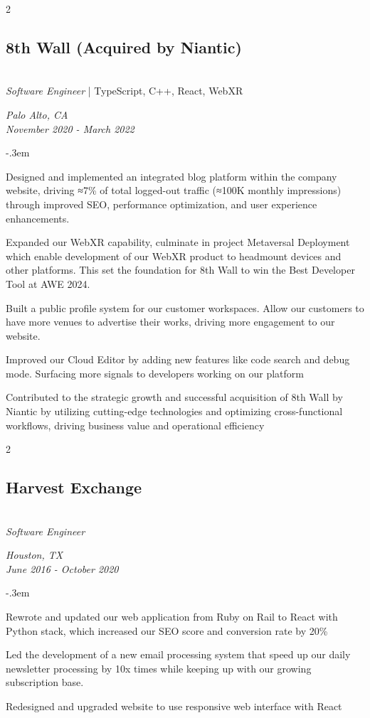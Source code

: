 \documentclass{article}
\let\olditemize=\itemize \let\endolditemize=\enditemize
\renewenvironment{itemize}{\olditemize[topsep=0em] \itemsep-.3em}{\endolditemize}
\newenvironment{twocolentry}[2][]{
    \def\secondColumn{#2}
    \raggedright
    \setcolumnwidth{\fill, 6cm}
    \begin{paracol}{2}
}{
    \switchcolumn \raggedleft \secondColumn
    \end{paracol}
} %
\begin{document}
\begin{twocolentry}{
  \textit{Palo Alto, CA} \\
  \textit{November 2020 - March 2022}
}
\subsection{8th Wall (Acquired by Niantic)}\hfill\\
\textit{Software Engineer} | TypeScript, C++, React, WebXR
\end{twocolentry}
\begin{itemize}
  \item Designed and implemented an integrated blog platform within the company website, driving
  ≈7\% of total logged-out traffic (≈100K monthly impressions) through improved SEO, performance
  optimization, and user experience enhancements.
  \item Expanded our WebXR capability, culminate in project Metaversal Deployment which enable
  development of our WebXR product to headmount devices and other platforms. This set the foundation
  for 8th Wall to win the Best Developer Tool at AWE 2024.
  \item Built a public profile system for our customer workspaces. Allow our customers to have more
  venues to advertise their works, driving more engagement to our website. 
  \item Improved our Cloud Editor by adding new features like code search and debug mode. Surfacing
  more signals to developers working on our platform
  \item Contributed to the strategic growth and successful acquisition of 8th Wall by Niantic by
  utilizing cutting-edge technologies and optimizing cross-functional workflows, driving business
  value and operational efficiency
\end{itemize}

\begin{twocolentry}{
  \textit{Houston, TX} \\
  \textit{June 2016 - October 2020} \\
}
\subsection{Harvest Exchange}\hfill\\
\textit{Software Engineer}
\end{twocolentry}
\begin{itemize}
  \item Rewrote and updated our web application from Ruby on Rail to React with Python stack, which
  increased our SEO score and conversion rate by 20\%
  \item Led the development of a new email processing system that speed up our daily newsletter
  processing by 10x times while keeping up with our growing subscription base.
  \item Redesigned and upgraded website to use responsive web interface with React
\end{itemize}
\end{document}
